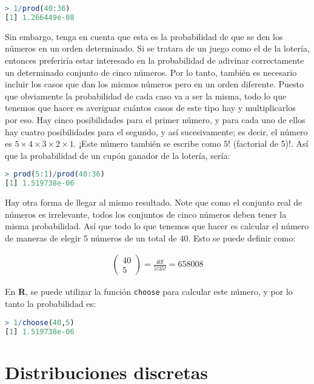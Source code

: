 \begin{lstlisting}[language=R]
> 1/prod(40:36)
[1] 1.266449e-08
\end{lstlisting}

Sin embargo, tenga en cuenta que esta es la probabilidad de que se den los
números en un orden determinado. Si se tratara de un juego como el de la
lotería, entonces preferiría estar interesado en la probabilidad de adivinar
correctamente un determinado conjunto de cinco números.  Por lo tanto, también
es necesario incluir los casos que dan los mismos números pero en un orden
diferente.  Puesto que obviamente la probabilidad de cada caso va a ser la
misma, todo lo que tenemos que hacer es averiguar cuántos casos de este tipo hay
y multiplicarlos por eso. Hay cinco posibilidades para el primer número, y para
cada uno de ellos hay cuatro posibilidades para el segundo, y así sucesivamente;
es decir, el número es $5 \times 4 \times 3 \times 2 \times 1$. ¡Este número
también se escribe como $5!$ (factorial de 5)!. Así que la probabilidad de un
cupón ganador de la lotería, sería:

\begin{lstlisting}[language=R]
> prod(5:1)/prod(40:36)
[1] 1.519738e-06
\end{lstlisting}

Hay otra forma de llegar al mismo resultado. Note que como el conjunto real de
números es irrelevante, todos los conjuntos de cinco números deben tener la
misma probabilidad. Así que todo lo que tenemos que hacer es calcular el número
de maneras de elegir 5 números de un total de 40. Esto se puede definir como:

\begin{gather*}
\left(
    \begin{array}{c}
      40\\
      5
  \end{array}
\right) = \frac{40!}{5!35!} = 658008
\end{gather*}

En \textbf{R}, se puede utilizar la función \texttt{choose} para calcular este
número, y por lo tanto la probabilidad es:

\begin{lstlisting}[language=R]
> 1/choose(40,5)
[1] 1.519738e-06
\end{lstlisting}

\section{Distribuciones discretas}


